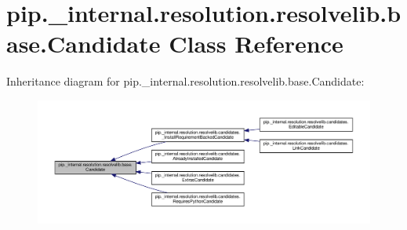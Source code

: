 \hypertarget{classpip_1_1__internal_1_1resolution_1_1resolvelib_1_1base_1_1Candidate}{}\section{pip.\+\_\+internal.\+resolution.\+resolvelib.\+base.\+Candidate Class Reference}
\label{classpip_1_1__internal_1_1resolution_1_1resolvelib_1_1base_1_1Candidate}


Inheritance diagram for pip.\+\_\+internal.\+resolution.\+resolvelib.\+base.\+Candidate\+:
\nopagebreak
\begin{figure}[H]
\begin{center}
\leavevmode
\includegraphics[width=350pt]{classpip_1_1__internal_1_1resolution_1_1resolvelib_1_1base_1_1Candidate__inherit__graph}
\end{center}
\end{figure}
